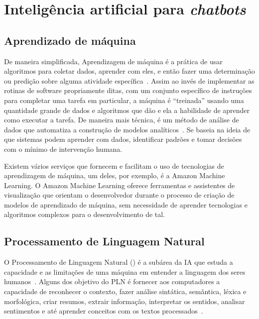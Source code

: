 \section{Inteligência artificial para \textit{chatbots}}\label{cap:02:sec:02:ia}

\subsection{Aprendizado de máquina}\label{cap:02:sec:02:sub:machine-learning}

De maneira simplificada, Aprendizagem de máquina é a prática de usar algoritmos para coletar dados, aprender com eles, e então fazer uma determinação ou predição sobre alguma atividade específica~\cite{SimpleML}. Assim ao invés de implementar as rotinas de software propriamente ditas, com um conjunto específico de instruções para completar uma tarefa em particular, a máquina é “treinada” usando uma quantidade grande de dados e algoritmos que dão e ela a habilidade de aprender como executar a tarefa. De maneira mais técnica, é um método de análise de dados que automatiza a construção de modelos analíticos~\cite{SASML}. Se baseia na ideia de que sistemas podem aprender com dados, identificar padrões e tomar decisões com o mínimo de intervenção humana.

Existem vários serviços que fornecem e facilitam o uso de tecnologias de aprendizagem de máquina, um deles, por exemplo, é a Amazon Machine Learning.
O Amazon Machine Learning oferece ferramentas e assistentes de visualização que orientam o desenvolvedor durante o processo de criação de modelos de aprendizado de máquina, sem necessidade de aprender tecnologias e algoritmos complexos para o desenvolvimento de tal. 


\subsection{Processamento de Linguagem Natural}\label{cap:02:sec:02:sub:pln}

O Processamento de Linguagem Natural () é a subárea da IA que estuda a capacidade e as limitações de uma máquina em entender a linguagem dos seres humanos~\cite{PLN1}.
Alguns dos objetivo do PLN é fornecer aos computadores a capacidade de  reconhecer o contexto, fazer análise sintática, semântica, léxica e morfológica, criar resumos, extrair informação, interpretar os sentidos, analisar sentimentos e até aprender conceitos com os textos processados~\cite{PLN1}.

